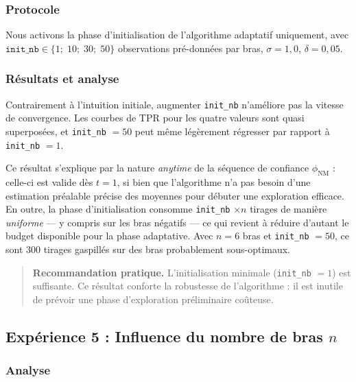 \documentclass[11pt,a4paper]{article}
\newcommand{\phinm}{\phi_{\mathrm{NM}}}
\begin{document}
\subsubsection{Protocole}

Nous activons la phase d'initialisation de l'algorithme adaptatif
uniquement, avec $\texttt{init\_nb} \in \{1;\; 10;\; 30;\; 50\}$
observations pré-données par bras, $\sigma = 1{,}0$, $\delta = 0{,}05$.

\subsubsection{Résultats et analyse}

Contrairement à l'intuition initiale, augmenter \texttt{init\_nb}
n'améliore pas la vitesse de convergence. Les courbes de TPR pour les
quatre valeurs sont quasi superposées, et \texttt{init\_nb} $= 50$
peut même légèrement régresser par rapport à \texttt{init\_nb} $= 1$.

Ce résultat s'explique par la nature \emph{anytime} de la séquence de
confiance $\phinm$ : celle-ci est valide dès $t = 1$, si bien
que l'algorithme n'a pas besoin d'une estimation préalable précise des
moyennes pour débuter une exploration efficace. En outre, la phase
d'initialisation consomme \texttt{init\_nb} $\times n$ tirages de
manière \emph{uniforme} — y compris sur les bras négatifs — ce qui
revient à réduire d'autant le budget disponible pour la phase
adaptative. Avec $n = 6$ bras et \texttt{init\_nb} $= 50$, ce sont
300 tirages gaspillés sur des bras probablement sous-optimaux.

\begin{quote}
\textbf{Recommandation pratique.} L'initialisation minimale
(\texttt{init\_nb} $= 1$) est suffisante. Ce résultat conforte
la robustesse de l'algorithme : il est inutile de prévoir une
phase d'exploration préliminaire coûteuse.
\end{quote}

\subsection{Expérience 5 : Influence du nombre de bras $n$}

\subsubsection{Analyse}
\end{document}
